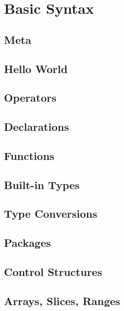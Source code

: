 \section{Basic Syntax}
\subsection{Meta}
\raggedbottom
\subsection{Hello World}
\raggedbottom
\subsection{Operators}
\raggedbottom
\subsection{Declarations}
\raggedbottom
\subsection{Functions}
\raggedbottom
\subsection{Built-in Types}
\raggedbottom
\subsection{Type Conversions}
\raggedbottom
\subsection{Packages}
\raggedbottom
\subsection{Control Structures}
\raggedbottom
\subsection{Arrays, Slices, Ranges}
\raggedbottom
